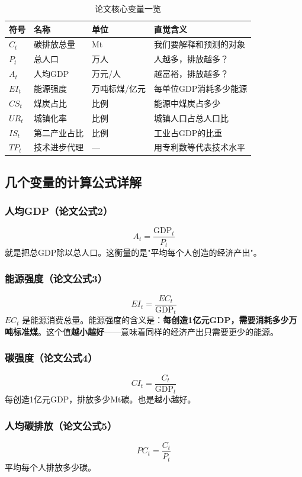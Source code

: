 \documentclass[12pt, a4paper]{article}
\begin{document}
\begin{table}[H]
\centering
\small
\begin{tabularx}{\textwidth}{lllX}
\toprule
\textbf{符号} & \textbf{名称} & \textbf{单位} & \textbf{直觉含义} \\
\midrule
 $C_t$ & 碳排放总量 & Mt & 我们要解释和预测的对象 \\
 $P_t$ & 总人口 & 万人 & 人越多，排放越多？ \\
 $A_t$ & 人均GDP & 万元/人 & 越富裕，排放越多？ \\
 $EI_t$ & 能源强度 & 万吨标煤/亿元 & 每单位GDP消耗多少能源 \\
 $CS_t$ & 煤炭占比 & 比例 & 能源中煤炭占多少 \\
 $UR_t$ & 城镇化率 & 比例 & 城镇人口占总人口比 \\
 $IS_t$ & 第二产业占比 & 比例 & 工业占GDP的比重 \\
 $TP_t$ & 技术进步代理 & — & 用专利数等代表技术水平 \\
\bottomrule
\end{tabularx}
\caption{论文核心变量一览}
\end{table}

\subsection{几个变量的计算公式详解}

\subsubsection{人均GDP（论文公式2）}
\[
A_t = \frac{\text{GDP}_t}{P_t}
\]
就是把总GDP除以总人口。这衡量的是"平均每个人创造的经济产出"。

\subsubsection{能源强度（论文公式3）}
\[
EI_t = \frac{EC_t}{\text{GDP}_t}
\]
 $EC_t$ 是能源消费总量。能源强度的含义是：\textbf{每创造1亿元GDP，需要消耗多少万吨标准煤}。这个值\textbf{越小越好}——意味着同样的经济产出只需要更少的能源。

\subsubsection{碳强度（论文公式4）}
\[
CI_t = \frac{C_t}{\text{GDP}_t}
\]
每创造1亿元GDP，排放多少Mt碳。也是越小越好。

\subsubsection{人均碳排放（论文公式5）}
\[
PC_t = \frac{C_t}{P_t}
\]
平均每个人排放多少碳。
\end{document}
